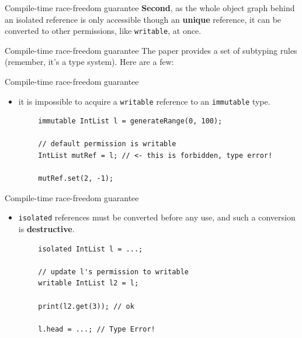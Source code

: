 \documentclass{beamer}
\begin{document}

\begin{frame}[fragile]{Compile-time race-freedom guarantee}
	\textbf{Second}, as the whole object graph behind an isolated reference
	is only accessible though an \textbf{unique} reference, it can be
	converted to other permissions, like \texttt{writable}, at once.
	\vfill
	\begin{center}
	\end{center}
\end{frame}


\begin{frame}{Compile-time race-freedom guarantee}
	The paper provides a set of subtyping rules (remember, it's a type
	system). Here are a few:
\end{frame}

\begin{frame}[fragile]{Compile-time race-freedom guarantee}
	\begin{itemize}
	\item it is impossible to acquire a \texttt{writable} reference to
	      an \texttt{immutable} type.
	\end{itemize}
	\begin{lstlisting}
		immutable IntList l = generateRange(0, 100);
		
		// default permission is writable
		IntList mutRef = l; // <- this is forbidden, type error!
		
		mutRef.set(2, -1);
	\end{lstlisting}
\end{frame}

\begin{frame}[fragile]{Compile-time race-freedom guarantee}
	\begin{itemize}
	\item \texttt{isolated} references must be converted before any use,
	      and such a conversion is \textbf{destructive}.
	\end{itemize}
	\begin{lstlisting}
		isolated IntList l = ...;
		
		// update l's permission to writable
		writable IntList l2 = l;
		
		print(l2.get(3)); // ok
		
		l.head = ...; // Type Error!
	\end{lstlisting}
\end{frame}
\end{document}
